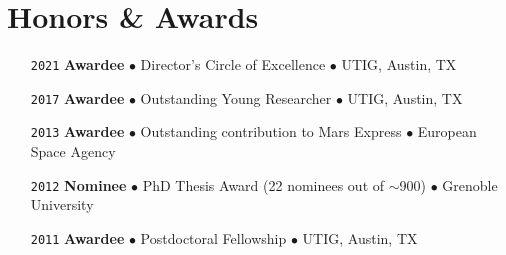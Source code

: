 \section*{Honors \& Awards}

\begin{itemize}[leftmargin=3.8em, labelsep=1.5em]
    \setlength\itemsep{-.5em}
    \item[\texttt{2021}] \textbf{Awardee} $\bullet$ Director's Circle of Excellence $\bullet$ UTIG, Austin, TX
    \item[\texttt{2017}] \textbf{Awardee} $\bullet$ Outstanding Young Researcher $\bullet$ UTIG, Austin, TX
    \item[\texttt{2013}] \textbf{Awardee} $\bullet$ Outstanding contribution to Mars Express $\bullet$ European Space Agency
    \item[\texttt{2012}] \textbf{Nominee} $\bullet$ PhD Thesis Award (22 nominees out of $\sim$900) $\bullet$ Grenoble University
    \item[\texttt{2011}] \textbf{Awardee} $\bullet$ Postdoctoral Fellowship $\bullet$ UTIG, Austin, TX
\end{itemize}

